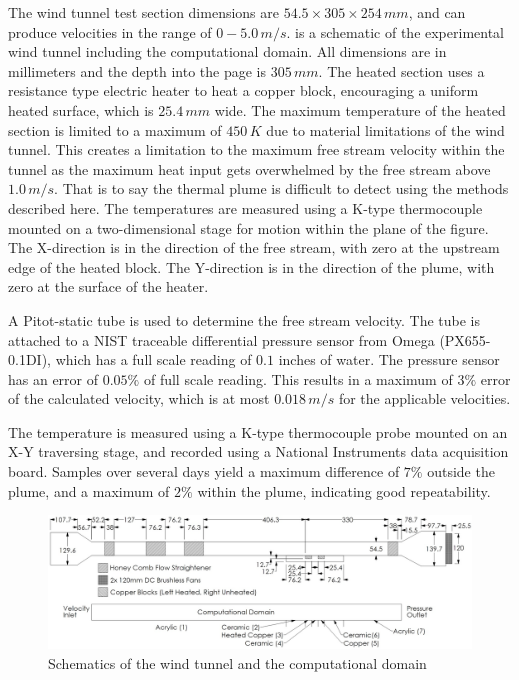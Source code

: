 \documentclass[preprint,12pt]{elsarticle}
\begin{document}
The wind tunnel test section dimensions are $54.5\times 305\times 254\, mm$, and can produce velocities in the range of $0-5.0\, m/s$.   is a schematic of the experimental wind tunnel including the computational domain.  All dimensions are in millimeters and the depth into the page is $305\, mm$.  The heated section uses a resistance type electric heater to heat a copper block, encouraging a uniform heated surface, which is $25.4\, mm$ wide.  The maximum temperature of the heated section is limited to a maximum of $450\, K$ due to material limitations of the wind tunnel.  This creates a limitation to the maximum free stream velocity within the tunnel as the maximum heat input gets overwhelmed by the free stream above $1.0\, m/s$.  That is to say the thermal plume is difficult to detect using the methods described here.  The temperatures are measured using a K-type thermocouple mounted on a two-dimensional stage for motion within the plane of the figure.  The X-direction is in the direction of the free stream, with zero at the upstream edge of the heated block.  The Y-direction is in the direction of the plume, with zero at the surface of the heater.  

A Pitot-static tube is used to determine the free stream velocity.  The tube is attached to a NIST traceable differential pressure sensor from Omega (PX655-0.1DI), which has a full scale reading of $0.1$ inches of water.  The pressure sensor has an error of $0.05\%$ of full scale reading.  This results in a maximum of $3\%$ error of the calculated velocity, which is at most $0.018\, m/s$ for the applicable velocities.

The temperature is measured using a K-type thermocouple probe mounted on an X-Y traversing stage, and recorded using a National Instruments data acquisition board.  Samples over several days yield a maximum difference of $7\%$ outside the plume, and a maximum of $2\%$ within the plume, indicating good repeatability.


\begin{figure}[!tbp]
\begin{center}
\includegraphics[scale=.30]{WindTunnel.jpg}
\caption{Schematics of the wind tunnel and the computational domain \cite{cht12}}
\label{fig:diagram}
\end{center}
\end{figure}
\end{document}
